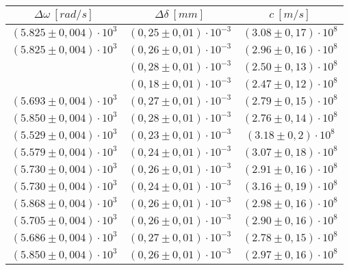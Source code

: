\begin{table}[H]
    \centering
        \begin{tabular}{|c|c|c|}
        \hline
        $ \Delta\omega~[rad/s] $ & $ \Delta\delta~[mm] $ & $ c~[m/s] $\\
        \hline
        $ (5.825 \pm 0,004) \cdot 10^{3} $ & $ (0,25 \pm 0,01) \cdot 10^{-3} $ & $ (3.08 \pm 0,17) \cdot 10^{8} $\\
        \hline
        $ (5.825 \pm 0,004) \cdot 10^{3} $ & $ (0,26 \pm 0,01) \cdot 10^{-3} $ & $ (2.96 \pm 0,16) \cdot 10^{8} $\\
        \hline
        \textcolor{red}{$ (5.265 \pm 0,004) \cdot 10^{3} $ & $ (0,28 \pm 0,01) \cdot 10^{-3} $ & $ (2.50 \pm 0,13) \cdot 10^{8} $}\\
        \hline
        \textcolor{red}{$ (5.228 \pm 0,004) \cdot 10^{3} $ & $ (0,18 \pm 0,01) \cdot 10^{-3} $ & $ (2.47 \pm 0,12) \cdot 10^{8} $}\\
        \hline
        $ (5.693 \pm 0,004) \cdot 10^{3} $ & $ (0,27 \pm 0,01) \cdot 10^{-3} $ & $ (2.79 \pm 0,15) \cdot 10^{8} $\\
        \hline
        $ (5.850 \pm 0,004) \cdot 10^{3} $ & $ (0,28 \pm 0,01) \cdot 10^{-3} $ & $ (2.76 \pm 0,14) \cdot 10^{8} $\\
        \hline
        $ (5.529 \pm 0,004) \cdot 10^{3} $ & $ (0,23 \pm 0,01) \cdot 10^{-3} $ & $ (3.18 \pm 0,2) \cdot 10^{8} $\\
        \hline
        $ (5.579 \pm 0,004) \cdot 10^{3} $ & $ (0,24 \pm 0,01) \cdot 10^{-3} $ & $ (3.07 \pm 0,18) \cdot 10^{8} $\\
        \hline
        $ (5.730 \pm 0,004) \cdot 10^{3} $ & $ (0,26 \pm 0,01) \cdot 10^{-3} $ & $ (2.91 \pm 0,16) \cdot 10^{8} $\\
        \hline
        $ (5.730 \pm 0,004) \cdot 10^{3} $ & $ (0,24 \pm 0,01) \cdot 10^{-3} $ & $ (3.16 \pm 0,19) \cdot 10^{8} $\\
        \hline
        $ (5.868 \pm 0,004) \cdot 10^{3} $ & $ (0,26 \pm 0,01) \cdot 10^{-3} $ & $ (2.98 \pm 0,16) \cdot 10^{8} $\\
        \hline
        $ (5.705 \pm 0,004) \cdot 10^{3} $ & $ (0,26 \pm 0,01) \cdot 10^{-3} $ & $ (2.90 \pm 0,16) \cdot 10^{8} $\\
        \hline
        $ (5.686 \pm 0,004) \cdot 10^{3} $ & $ (0,27 \pm 0,01) \cdot 10^{-3} $ & $ (2.78 \pm 0,15) \cdot 10^{8} $\\
        \hline
        $ (5.850 \pm 0,004) \cdot 10^{3} $ & $ (0,26 \pm 0,01) \cdot 10^{-3} $ & $ (2.97 \pm 0,16) \cdot 10^{8} $\\

\end{tabular}
\end{table}

